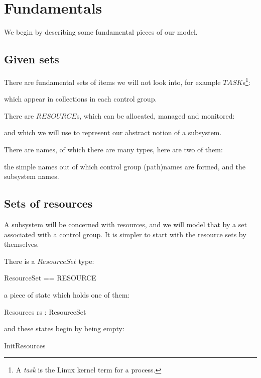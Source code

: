 \documentclass[a4paper,twoside,12pt]{article}
\begin{document}
\section{Fundamentals}
\label{sec:fundamentals}

We begin by describing some fundamental pieces of our model.

\subsection{Given sets}
There are fundamental sets of items we will not look into, 
for example $TASK$s\footnote{A \emph{task} is the Linux kernel term for a process.}:
\begin{zed}
[TASK]
\end{zed}
which appear in collections in each control group.

There are $RESOURCE$s, which can be allocated, managed and monitored:
\begin{zed}
[RESOURCE]
\end{zed}
and which we will use to represent our abstract notion of a subsystem.

There are names, of which there are many types, here are two of them:
\begin{zed}
\end{zed}
the simple names out of which control group (path)names are formed, and the subsystem names.

\subsection{Sets of resources}

A subsystem will be concerned with resources, and we will model that by a set associated
with a control group. It is simpler to start with the resource sets by themselves.

There is a $ResourceSet$ type:
\begin{zed}
ResourceSet == \finset RESOURCE
\end{zed}
a piece of state which holds one of them:
\begin{schema}{Resources}
rs : ResourceSet
\end{schema}
and these states begin by being empty:
\begin{zed}
InitResources 
\end{zed}
\end{document}
